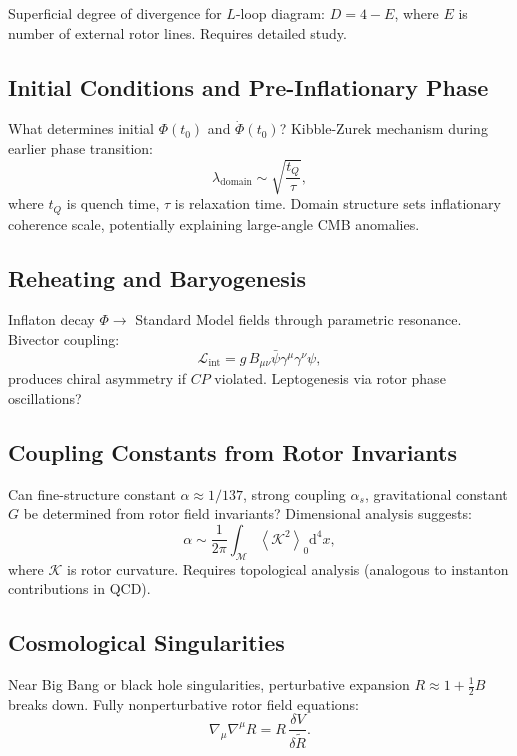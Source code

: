 \documentclass[11pt,a4paper]{article}
\numberwithin{equation}{section}
\theoremstyle{plain}
\theoremstyle{definition}
\theoremstyle{remark}
\newcommand{\grade}[2]{\left\langle #1 \right\rangle_{#2}}
\newcommand{\scal}[1]{\grade{#1}{0}}       %
\newcommand{\rev}[1]{\widetilde{#1}}       %
\newcommand{\dd}{\mathrm{d}}
\begin{document}
Superficial degree of divergence for $L$-loop diagram: $D = 4 - E$, where $E$ is number of external rotor lines. Requires detailed study.

\subsection{Initial Conditions and Pre-Inflationary Phase}

What determines initial $\Phi(t_0)$ and $\dot{\Phi}(t_0)$? Kibble-Zurek mechanism during earlier phase transition:
\begin{equation}
\lambda_{\mathrm{domain}} \sim \sqrt{\frac{t_Q}{\tau}},
\end{equation}
where $t_Q$ is quench time, $\tau$ is relaxation time. Domain structure sets inflationary coherence scale, potentially explaining large-angle CMB anomalies.

\subsection{Reheating and Baryogenesis}

Inflaton decay $\Phi \to$ Standard Model fields through parametric resonance. Bivector coupling:
\begin{equation}
\mathcal{L}_{\mathrm{int}} = g\,B_{\mu\nu}\bar{\psi}\gamma^\mu\gamma^\nu\psi,
\end{equation}
produces chiral asymmetry if $CP$ violated. Leptogenesis via rotor phase oscillations?

\subsection{Coupling Constants from Rotor Invariants}

Can fine-structure constant $\alpha \approx 1/137$, strong coupling $\alpha_s$, gravitational constant $G$ be determined from rotor field invariants? Dimensional analysis suggests:
\begin{equation}
\alpha \sim \frac{1}{2\pi}\int_{\mathcal{M}} \scal{\mathcal{K}^2}\dd^4x,
\end{equation}
where $\mathcal{K}$ is rotor curvature. Requires topological analysis (analogous to instanton contributions in QCD).

\subsection{Cosmological Singularities}

Near Big Bang or black hole singularities, perturbative expansion $R \approx 1 + \frac{1}{2}B$ breaks down. Fully nonperturbative rotor field equations:
\begin{equation}
\nabla_\mu\nabla^\mu R = R\,\frac{\delta V}{\delta\rev{R}}.
\end{equation}
\end{document}
